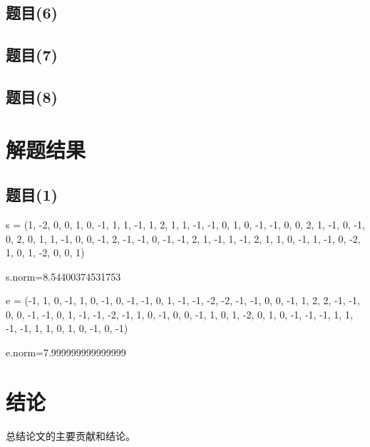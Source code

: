 \documentclass[12pt,a4paper]{article}
\numberwithin{equation}{section}
\begin{document}
\subsection{题目(6)}

\subsection{题目(7)}

\subsection{题目(8)}

\section{解题结果}

\subsection{题目(1)}


s = (1, -2, 0, 0, 1, 0, -1, 1, 1, -1, 1, 2, 1, 1,
-1, -1, 0, 1, 0, -1, -1, 0, 0, 2, 1, -1, 0, -1, 0, 2, 0, 1,
1, -1, 0, 0, -1, 2, -1, -1, 0, -1, -1, 2, 1, -1, 1, -1, 2, 1, 1, 0,
-1, 1, -1, 0, -2, 1, 0, 1, -2, 0, 0, 1)

s.norm=8.54400374531753

\hspace*{\fill}

e = (-1, 1, 0, -1, 1, 0, -1, 0, -1, -1, 0, 1, -1, -1, -2, -2, -1, -1, 0, 0, -1, 1, 2, 2, -1,
-1, 0, 0, -1, -1, 0, 1, -1, -1, -2, -1, 1, 0, -1, 0, 0, -1, 1, 0, 1, -2, 0, 1, 0, -1, -1,
-1, 1, 1, -1, -1, 1, 1, 0, 1, 0, -1, 0, -1)

e.norm=7.999999999999999

\section{结论}

总结论文的主要贡献和结论。

\vspace{1em}

{\songti\fontsize{12pt}{18pt}\selectfont
	
}
\end{document}

